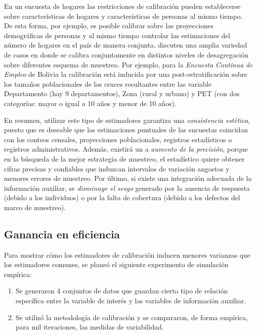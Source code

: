 \documentclass[
  10pt,
  spanish,
]{book}
\providecommand{\tightlist}{%
  \setlength{\itemsep}{0pt}\setlength{\parskip}{0pt}}
\begin{document}
En un encuesta de hogares las restricciones de calibración pueden establecerse sobre características de hogares y características de personas al mismo tiempo. De esta forma, por ejemplo, es posible calibrar sobre las proyecciones demográficas de personas y al mismo tiempo controlar las estimaciones del número de hogares en el país de manera conjunta. \citet{Estevao_Sarndal_2006} discuten una amplia variedad de casos en donde se calibra conjuntamente en distintos niveles de desagregación sobre diferentes esquema de muestreo. Por ejemplo, para la \emph{Encuesta Continua de Empleo} de Bolivia la calibración está inducida por una post-estratificación sobre los tamaños poblacionales de los cruces resultantes entre las variable Departamento (hay 9 departamentos), Zona (rural y urbano) y PET (con dos categorías: mayor o igual a 10 años y menor de 10 años).

En resumen, utilizar este tipo de estimadores garantiza una \emph{consistencia estética}, puesto que es deseable que las estimaciones puntuales de las encuestas coincidan con los conteos censales, proyecciones poblacionales, registros estadísticos o registros administrativos. Además, existirá un a \emph{aumento de la precisión}, porque en la búsqueda de la mejor estrategia de muestreo, el estadístico quiere obtener cifras precisas y confiables que induzcan intervalos de variación angostos y menores errores de muestreo. Por último, si existe una integración adecuada de la información auxiliar, se \emph{disminuye el sesgo} generado por la ausencia de respuesta (debido a los individuos) o por la falta de cobertura (debido a los defectos del marco de muestreo).

\hypertarget{ganancia-en-eficiencia}{%
\subsection{Ganancia en eficiencia}\label{ganancia-en-eficiencia}}

Para mostrar cómo los estimadores de calibración inducen menores varianzas que los estimadores comunes, se planeó el siguiente experimento de simulación empírica:

\begin{enumerate}
\def\labelenumi{\arabic{enumi}.}
\tightlist
\item
  Se generaron 4 conjuntos de datos que guardan cierto tipo de relación específica entre la variable de interés y las variables de información auxiliar.
\item
  Se utilizó la metodología de calibración y se compararon, de forma empírica, para mil iteraciones, las medidas de variabilidad.
\end{enumerate}
\end{document}
